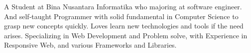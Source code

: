 

\begin{cvparagraph}

A Student at Bina Nusantara Informatika who majoring at software engineer. And self‑taught Programmer with solid fundamental in Computer
Science to grasp new concepts quickly. Loves learn new technologies and tools if the need arises. Specializing in Web Development and Problem
solve, with Experience in Responsive Web, and various Frameworks and Libraries.

\end{cvparagraph}
